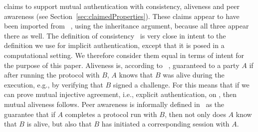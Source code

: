 \mEdhoc{} claims to support mutual authentication with consistency, aliveness
and peer awareness (see Section~\ref{sec:claimedProperties}).
%
These claims appear to have been imported from \mSigma{}~\cite{sigma}, using the
inheritance argument, because all three appear there as well.
%
The definition of consistency~\cite{sigma} is very close in intent to the
definition we use for implicit authentication, except that it is posed in a
computational setting.
%
We therefore consider them equal in terms of intent for the purpose of this
paper.
%
Aliveness is, according to \mSigma{}~\cite{sigma}, guaranteed to a party $A$ if
after running the protocol with $B$, $A$ knows that $B$ was alive during
the execution, e.g., by verifying that $B$ signed a challenge.
%
For \mEdhoc{} this means that if we can prove mutual injective agreement, i.e.,
explicit authentication, on \mGxy{}, then mutual aliveness follows.
%
Peer awareness is informally defined in~\cite{sigma} as the guarantee
that if $A$ completes a protocol run with $B$, then not only does $A$
know that $B$ is alive, but also that $B$ has initiated a corresponding session
with $A$.
\\



